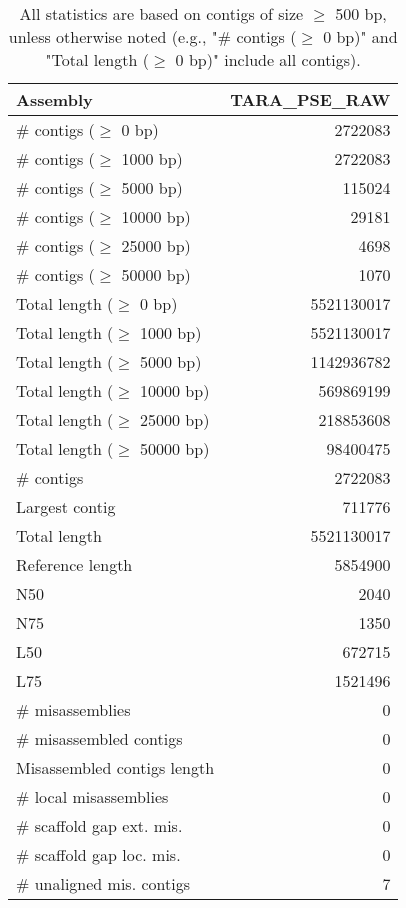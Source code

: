 \documentclass[12pt,a4paper]{article}
\begin{document}
\begin{table}[ht]
\begin{center}
\caption{All statistics are based on contigs of size $\geq$ 500 bp, unless otherwise noted (e.g., "\# contigs ($\geq$ 0 bp)" and "Total length ($\geq$ 0 bp)" include all contigs).}
\begin{tabular}{|l*{1}{|r}|}
\hline
Assembly & TARA\_PSE\_RAW \\ \hline
\# contigs ($\geq$ 0 bp) & 2722083 \\ \hline
\# contigs ($\geq$ 1000 bp) & 2722083 \\ \hline
\# contigs ($\geq$ 5000 bp) & 115024 \\ \hline
\# contigs ($\geq$ 10000 bp) & 29181 \\ \hline
\# contigs ($\geq$ 25000 bp) & 4698 \\ \hline
\# contigs ($\geq$ 50000 bp) & 1070 \\ \hline
Total length ($\geq$ 0 bp) & 5521130017 \\ \hline
Total length ($\geq$ 1000 bp) & 5521130017 \\ \hline
Total length ($\geq$ 5000 bp) & 1142936782 \\ \hline
Total length ($\geq$ 10000 bp) & 569869199 \\ \hline
Total length ($\geq$ 25000 bp) & 218853608 \\ \hline
Total length ($\geq$ 50000 bp) & 98400475 \\ \hline
\# contigs & 2722083 \\ \hline
Largest contig & 711776 \\ \hline
Total length & 5521130017 \\ \hline
Reference length & 5854900 \\ \hline
N50 & 2040 \\ \hline
N75 & 1350 \\ \hline
L50 & 672715 \\ \hline
L75 & 1521496 \\ \hline
\# misassemblies & 0 \\ \hline
\# misassembled contigs & 0 \\ \hline
Misassembled contigs length & 0 \\ \hline
\# local misassemblies & 0 \\ \hline
\# scaffold gap ext. mis. & 0 \\ \hline
\# scaffold gap loc. mis. & 0 \\ \hline
\# unaligned mis. contigs & 7 \\ \hline

\end{tabular}
\end{center}
\end{table}
\end{document}
